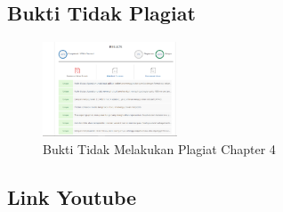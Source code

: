 \subsection{Bukti Tidak Plagiat}
\begin{figure}[H]
\centering
	\includegraphics[width=4cm]{figures/1174077/4/buktiplagiat/1.PNG}
	\caption{Bukti Tidak Melakukan Plagiat Chapter 4}
\end{figure}

\subsection{Link Youtube}


